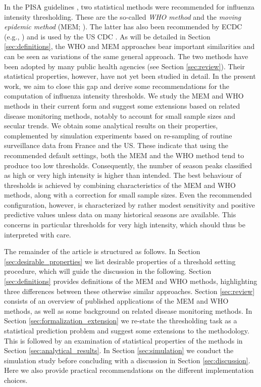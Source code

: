 \documentclass[12pt]{article}
\begin{document}
In the PISA guidelines \citep{WHO2017}, two statistical methods were recommended for influenza intensity thresholding. These are the so-called \textit{WHO method} \citep{WHO2014} and the \textit{moving epidemic method} (MEM; \citealt{Vega2015}). The latter has also been recommended by ECDC (e.g., \citealt{ECDC2017}) and is used by the US CDC \citep{Biggerstaff2017}. As will be detailed in Section \ref{sec:definitions}, the WHO and MEM approaches bear important similarities and can be seen as variations of the same general approach. The two methods have been adopted by many public health agencies (see Section \ref{sec:review}). Their statistical properties, however, have not yet been studied in detail. In the present work, we aim to close this gap and derive some recommendations for the computation of influenza intensity thresholds. We study the MEM and WHO methods in their current form and suggest some extensions based on related disease monitoring methods, notably to account for small sample sizes and secular trends. We obtain some analytical results on their properties, complemented by simulation experiments based on re-sampling of routine surveillance data from France and the US. These indicate that using the recommended default settings, both the MEM and the WHO method tend to produce too low thresholds. Consequently, the number of season peaks classified as high or very high intensity is higher than intended. The best behaviour of thresholds is achieved by combining characteristics of the MEM and WHO methods, along with a correction for small sample sizes. Even the recommended configuration, however, is characterized by rather modest sensitivity and positive predictive values unless data on many historical seasons are available. This concerns in particular thresholds for very high intensity, which should thus be interpreted with care. %

The remainder of the article is structured as follows. In Section \ref{sec:desirable_properties} we list desirable properties of a threshold setting procedure, which will guide the discussion in the following. Section \ref{sec:definitions} provides definitions of the MEM and WHO methods, highlighting three differences between these otherwise similar approaches. Section \ref{sec:review} consists of an overview of published applications of the MEM and WHO methods, as well as some background on related disease monitoring methods. In Section \ref{sec:formalization_extension} we re-state the thresholding task as a statistical prediction problem and suggest some extensions to the methodology. This is followed by an examination of statistical properties of the methods in Section \ref{sec:analytical_results}. In Section \ref{sec:simulation} we conduct the simulation study before concluding with a discussion in Section \ref{sec:discussion}. Here we also provide practical recommendations on the different implementation choices.
\end{document}
